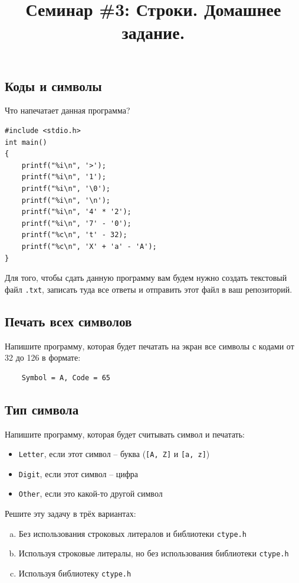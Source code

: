 \documentclass{article}
\begin{document}
\title{Семинар \#3: Строки. Домашнее задание.\vspace{-5ex}}\date{}\maketitle

\subsection{Коды и символы}
Что напечатает данная программа?
\begin{lstlisting}
#include <stdio.h>
int main()
{
	printf("%i\n", '>');
	printf("%i\n", '1');
	printf("%i\n", '\0');
	printf("%i\n", '\n');
	printf("%i\n", '4' * '2');
	printf("%i\n", '7' - '0');
	printf("%c\n", 't' - 32);
	printf("%c\n", 'X' + 'a' - 'A');
}
\end{lstlisting}
Для того, чтобы сдать данную программу вам будем нужно создать текстовый файл \texttt{.txt}, записать туда все ответы и отправить этот файл в ваш репозиторий.

\subsection{Печать всех символов}
Напишите программу, которая будет печатать на экран все символы с кодами от 32 до 126 в формате:
\begin{verbatim}
    Symbol = A, Code = 65
\end{verbatim}
                

\subsection{Тип символа}
Напишите программу, которая будет считывать символ и печатать:
\begin{itemize}
\item \texttt{Letter}, если этот символ – буква (\texttt{[A, Z]} и \texttt{[a, z]})
\item \texttt{Digit}, если этот символ – цифра
\item \texttt{Other}, если это какой-то другой символ
\end{itemize}

Решите эту задачу в трёх вариантах:
\begin{enumerate}[(a)]
\item Без использования строковых литералов и библиотеки \texttt{ctype.h}
\item Используя строковые литералы, но без использования библиотеки \texttt{ctype.h}
\item Используя библиотеку \texttt{ctype.h}
\end{enumerate}
\end{document}
